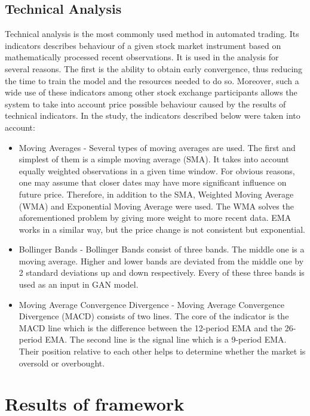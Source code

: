 \documentclass[11pt]{article} %
\begin{document}
\subsection{Technical Analysis}
Technical analysis is the most commonly used method in automated trading. Its indicators describes behaviour of a given stock market instrument based on mathematically processed recent observations. It is used in the analysis for several reasons. The first is the ability to obtain early convergence, thus reducing the time to train the model and the resources needed to do so. Moreover, such a wide use of these indicators among other stock exchange participants allows the system to take into account price possible behaviour caused by the results of technical indicators. In the study, the indicators described below were taken into account: 
\begin{itemize}
\item Moving Averages - Several types of moving averages are used. The first and simplest of them is a simple moving average (SMA). It takes into account equally weighted observations in a given time window. For obvious reasons, one may assume that closer dates may have more significant influence on future price. Therefore, in addition to the SMA, Weighted Moving Average (WMA) and Exponential Moving Average were used. The WMA solves the aforementioned problem by giving more weight to more recent data. EMA works in a similar way, but the price change is not consistent but exponential.

\item Bollinger Bands - Bollinger Bands consist of three bands. The middle one is a moving average. Higher and lower bands are deviated from the middle one by 2 standard deviations up and down respectively. Every of these three bands is used as an input in GAN model.

\item Moving Average Convergence Divergence - Moving Average Convergence Divergence (MACD) consists of two lines. The core of the indicator is the MACD line which is the difference between the 12-period EMA and the 26-period EMA. The second line is the signal line which is a 9-period EMA. Their position relative to each other helps to determine whether the market is oversold or overbought.
\end{itemize}

\section{Results of framework}
\end{document}

